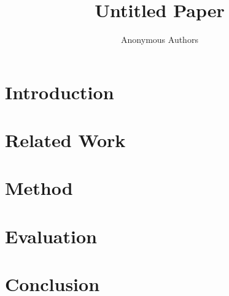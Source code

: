 \documentclass[runningheads]{llncs}
\title{Untitled Paper}
\author{Anonymous Authors}
\begin{document}
\maketitle
\begin{abstract}
\end{abstract}
\section{Introduction}
\section{Related Work}
\section{Method}
\section{Evaluation}
\section{Conclusion}


\end{document}

